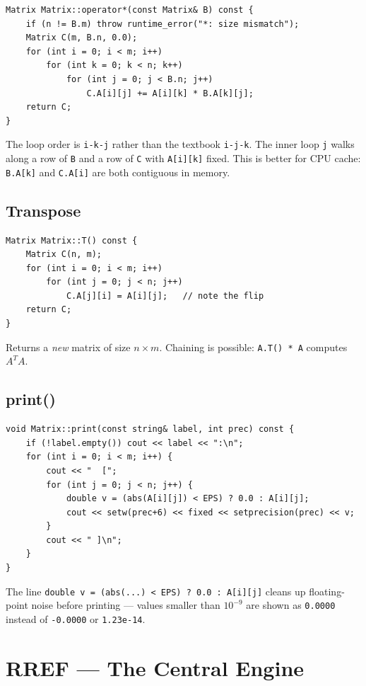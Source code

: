 \documentclass[12pt, a4paper]{article}
\newcommand{\code}[1]{\texttt{\small#1}}
\begin{document}
\begin{lstlisting}
Matrix Matrix::operator*(const Matrix& B) const {
    if (n != B.m) throw runtime_error("*: size mismatch");
    Matrix C(m, B.n, 0.0);
    for (int i = 0; i < m; i++)
        for (int k = 0; k < n; k++)
            for (int j = 0; j < B.n; j++)
                C.A[i][j] += A[i][k] * B.A[k][j];
    return C;
}
\end{lstlisting}

The loop order is \code{i-k-j} rather than the textbook \code{i-j-k}.
The inner loop \code{j} walks along a row of \code{B} and a row of \code{C}
with \code{A[i][k]} fixed.  This is better for CPU cache: \code{B.A[k]} and
\code{C.A[i]} are both contiguous in memory.

\subsection{Transpose}

\begin{lstlisting}
Matrix Matrix::T() const {
    Matrix C(n, m);
    for (int i = 0; i < m; i++)
        for (int j = 0; j < n; j++)
            C.A[j][i] = A[i][j];   // note the flip
    return C;
}
\end{lstlisting}

Returns a \emph{new} matrix of size $n \times m$.  Chaining is possible:
\code{A.T() * A} computes $A^TA$.

\subsection{print()}

\begin{lstlisting}
void Matrix::print(const string& label, int prec) const {
    if (!label.empty()) cout << label << ":\n";
    for (int i = 0; i < m; i++) {
        cout << "  [";
        for (int j = 0; j < n; j++) {
            double v = (abs(A[i][j]) < EPS) ? 0.0 : A[i][j];
            cout << setw(prec+6) << fixed << setprecision(prec) << v;
        }
        cout << " ]\n";
    }
}
\end{lstlisting}

The line \code{double v = (abs(...) < EPS) ? 0.0 : A[i][j]} cleans up
floating-point noise before printing --- values smaller than $10^{-9}$ are
shown as \code{0.0000} instead of \code{-0.0000} or \code{1.23e-14}.

\section{RREF --- The Central Engine}
\end{document}
